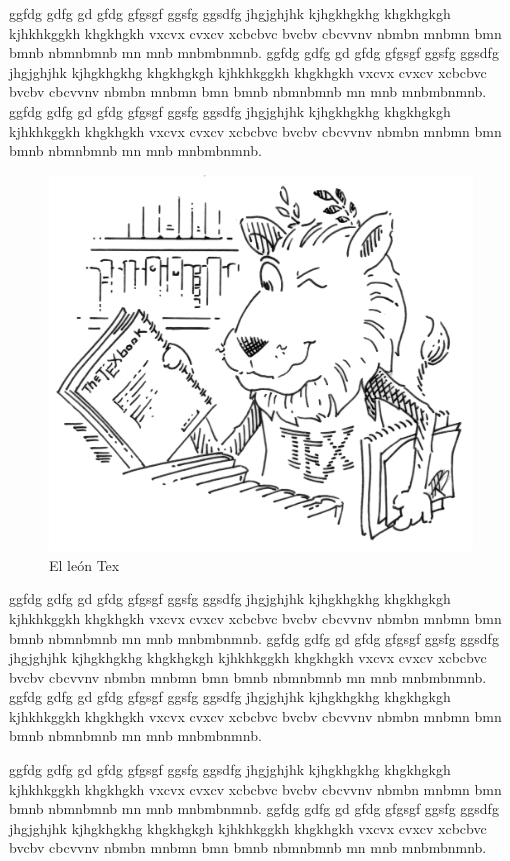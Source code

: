 \documentclass[a4paper, 12pt]{article}
\begin{document}
\begin{minipage}{0.99\textwidth}
	
	ggfdg gdfg gd gfdg gfgsgf ggsfg ggsdfg jhgjghjhk kjhgkhgkhg khgkhgkgh kjhkhkggkh khgkhgkh vxcvx cvxcv xcbcbvc bvcbv cbcvvnv nbmbn mnbmn bmn bmnb nbmnbmnb mn mnb mnbmbnmnb.
	ggfdg gdfg gd gfdg gfgsgf ggsfg ggsdfg jhgjghjhk kjhgkhgkhg khgkhgkgh kjhkhkggkh khgkhgkh vxcvx cvxcv xcbcbvc bvcbv cbcvvnv nbmbn mnbmn bmn bmnb nbmnbmnb mn mnb mnbmbnmnb.
	ggfdg gdfg gd gfdg gfgsgf ggsfg ggsdfg jhgjghjhk kjhgkhgkhg khgkhgkgh kjhkhkggkh khgkhgkh vxcvx cvxcv xcbcbvc bvcbv cbcvvnv nbmbn mnbmn bmn bmnb nbmnbmnb mn mnb mnbmbnmnb.
	\begin{figure}
		\vspace{-5mm}
		\includegraphics[width=0.8\linewidth]{tex_lion}
		\caption{El león Tex}
		\label{fig:leontex2}
	\end{figure}
	ggfdg gdfg gd gfdg gfgsgf ggsfg ggsdfg jhgjghjhk kjhgkhgkhg khgkhgkgh kjhkhkggkh khgkhgkh vxcvx cvxcv xcbcbvc bvcbv cbcvvnv nbmbn mnbmn bmn bmnb nbmnbmnb mn mnb mnbmbnmnb.
	ggfdg gdfg gd gfdg gfgsgf ggsfg ggsdfg jhgjghjhk kjhgkhgkhg khgkhgkgh kjhkhkggkh khgkhgkh vxcvx cvxcv xcbcbvc bvcbv cbcvvnv nbmbn mnbmn bmn bmnb nbmnbmnb mn mnb mnbmbnmnb.
	ggfdg gdfg gd gfdg gfgsgf ggsfg ggsdfg jhgjghjhk kjhgkhgkhg khgkhgkgh kjhkhkggkh khgkhgkh vxcvx cvxcv xcbcbvc bvcbv cbcvvnv nbmbn mnbmn bmn bmnb nbmnbmnb mn mnb mnbmbnmnb.
	
	ggfdg gdfg gd gfdg gfgsgf ggsfg ggsdfg jhgjghjhk kjhgkhgkhg khgkhgkgh kjhkhkggkh khgkhgkh vxcvx cvxcv xcbcbvc bvcbv cbcvvnv nbmbn mnbmn bmn bmnb nbmnbmnb mn mnb mnbmbnmnb.
	ggfdg gdfg gd gfdg gfgsgf ggsfg ggsdfg jhgjghjhk kjhgkhgkhg khgkhgkgh kjhkhkggkh khgkhgkh vxcvx cvxcv xcbcbvc bvcbv cbcvvnv nbmbn mnbmn bmn bmnb nbmnbmnb mn mnb mnbmbnmnb.
	
	\end{minipage}
	
\end{document}
